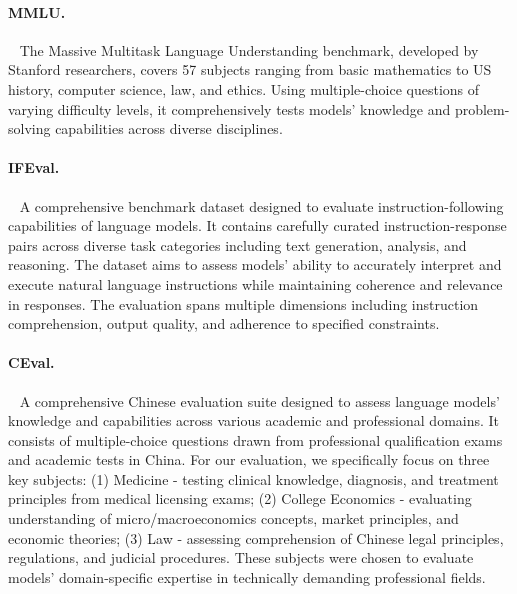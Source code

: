 \paragraph{MMLU.}~\citep{hendrycks2021mmlu} The Massive Multitask Language Understanding benchmark, developed by Stanford researchers, covers 57 subjects ranging from basic mathematics to US history, 
computer science, law, and ethics. Using multiple-choice questions of varying difficulty levels, it comprehensively tests models' knowledge and problem-solving capabilities 
across diverse disciplines.

\paragraph{IFEval.}~\citep{zhou2023ifeval}  A comprehensive benchmark dataset designed to evaluate instruction-following capabilities of language models. It contains carefully curated 
instruction-response pairs across diverse task categories including text generation, analysis, and reasoning. The dataset aims to assess models' ability to accurately 
interpret and execute natural language instructions while maintaining coherence and relevance in responses. The evaluation spans multiple dimensions including instruction comprehension, 
output quality, and adherence to specified constraints.

\paragraph{CEval.}~\citep{huang2023ceval} A comprehensive Chinese evaluation suite designed to assess language models' knowledge and capabilities across various academic and professional domains. 
It consists of multiple-choice questions drawn from professional qualification exams and academic tests in China. For our evaluation, we specifically focus on three key subjects:
(1) Medicine - testing clinical knowledge, diagnosis, and treatment principles from medical licensing exams;
(2) College Economics - evaluating understanding of micro/macroeconomics concepts, market principles, and economic theories;
(3) Law - assessing comprehension of Chinese legal principles, regulations, and judicial procedures.
These subjects were chosen to evaluate models' domain-specific expertise in technically demanding professional fields.